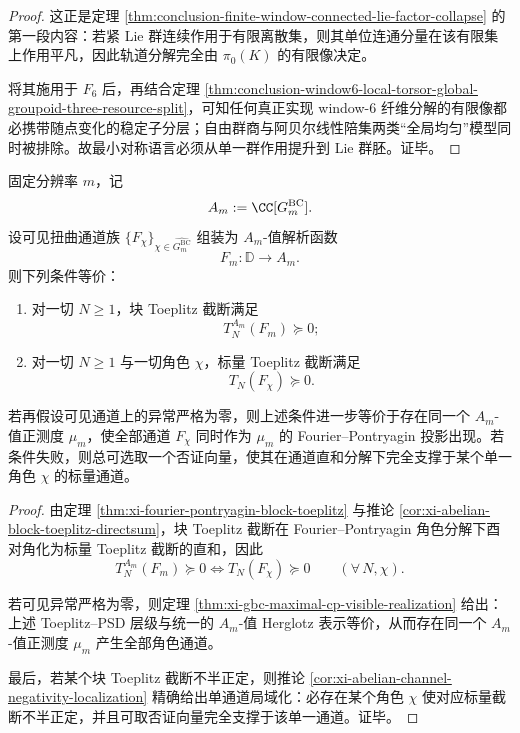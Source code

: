 \begin{proof}
这正是定理 \ref{thm:conclusion-finite-window-connected-lie-factor-collapse} 的第一段内容：若紧 Lie 群连续作用于有限离散集，则其单位连通分量在该有限集上作用平凡，因此轨道分解完全由 \(\pi_0(K)\) 的有限像决定。

将其施用于 \(F_6\) 后，再结合定理 \ref{thm:conclusion-window6-local-torsor-global-groupoid-three-resource-split}，可知任何真正实现 window-\(6\) 纤维分解的有限像都必携带随点变化的稳定子分层；自由群商与阿贝尔线性陪集两类“全局均匀”模型同时被排除。故最小对称语言必须从单一群作用提升到 Lie 群胚。证毕。
\end{proof}

\begin{corollary}[完全正可见实现的逐角色判别与单通道否证器]\label{cor:derived-cp-visible-characterwise-single-channel-falsifier}
固定分辨率 \(m\)，记
\[
A_m:=\CC[G_m^{\mathrm{BC}}].
\]
设可见扭曲通道族 \(\{F_\chi\}_{\chi\in\widehat{G_m^{\mathrm{BC}}}}\) 组装为 \(A_m\)-值解析函数
\[
F_m:\mathbb D\to A_m.
\]
则下列条件等价：
\begin{enumerate}
\normalfont
  \item 对一切 \(N\ge 1\)，块 Toeplitz 截断满足
  \[
  T_N^{A_m}(F_m)\succeq 0;
  \]
  \item 对一切 \(N\ge 1\) 与一切角色 \(\chi\)，标量 Toeplitz 截断满足
  \[
  T_N(F_\chi)\succeq 0.
  \]
\end{enumerate}
若再假设可见通道上的异常严格为零，则上述条件进一步等价于存在同一个 \(A_m\)-值正测度 \(\mu_m\)，使全部通道 \(F_\chi\) 同时作为 \(\mu_m\) 的 Fourier--Pontryagin 投影出现。若条件失败，则总可选取一个否证向量，使其在通道直和分解下完全支撑于某个单一角色 \(\chi\) 的标量通道。
\end{corollary}

\begin{proof}
由定理 \ref{thm:xi-fourier-pontryagin-block-toeplitz} 与推论 \ref{cor:xi-abelian-block-toeplitz-directsum}，块 Toeplitz 截断在 Fourier--Pontryagin 角色分解下酉对角化为标量 Toeplitz 截断的直和，因此
\[
T_N^{A_m}(F_m)\succeq 0
\iff
T_N(F_\chi)\succeq 0
\qquad
(\forall\,N,\chi).
\]

若可见异常严格为零，则定理 \ref{thm:xi-gbc-maximal-cp-visible-realization} 给出：上述 Toeplitz--PSD 层级与统一的 \(A_m\)-值 Herglotz 表示等价，从而存在同一个 \(A_m\)-值正测度 \(\mu_m\) 产生全部角色通道。

最后，若某个块 Toeplitz 截断不半正定，则推论 \ref{cor:xi-abelian-channel-negativity-localization} 精确给出单通道局域化：必存在某个角色 \(\chi\) 使对应标量截断不半正定，并且可取否证向量完全支撑于该单一通道。证毕。
\end{proof}

\endinput
